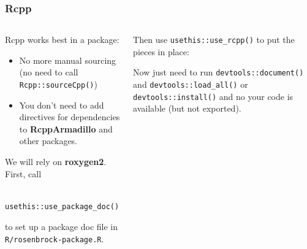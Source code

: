 \documentclass[aspectratio=1610,onlytextwidth]{beamer}
\begin{document}
\begin{frame}[c,fragile]
  \frametitle{Rcpp}

  \begin{columns}[T]
    \begin{column}{0.48\textwidth}

      Rcpp works best in a package:
      \begin{itemize}
        \item No more manual sourcing (no need to call \lstinline{Rcpp::sourceCpp()})
        \item You don't need to add directives for dependencies to \textbf{RcppArmadillo} and other
              packages.
      \end{itemize}

      \pause\medskip

      We will rely on \textbf{roxygen2}. First, call
      \begin{lstlisting}
        usethis::use_package_doc()
      \end{lstlisting}
      to set up a package doc file in \texttt{R/rosenbrock-package.R}.
    \end{column}

    \pause

    \begin{column}{0.42\textwidth}
      Then use \lstinline{usethis::use_rcpp()} to put the pieces in place:

      \medskip


      \medskip\pause

      Now just need to run \texttt{devtools::document()} and
      \lstinline{devtools::load_all()} or \lstinline{devtools::install()}
      and no your code is available (but not exported).
    \end{column}
  \end{columns}

\end{frame}
\end{document}

